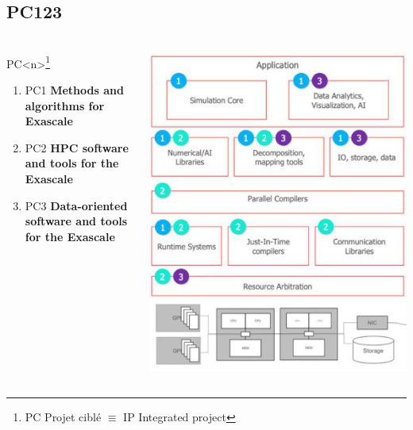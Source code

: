 \subsection{PC123}

\begin{frame}
  \frametitle{\insertsectionhead}
  \framesubtitle{\insertsubsectionhead}
  \begin{columns}
    \begin{column}{0.5\textwidth}
      \begin{alertblock}{PC<n>\footnote{PC Projet ciblé $\equiv$ IP Integrated project}}

      \begin{enumerate}
        \item \alert{PC1} \textbf{Methods and algorithms for
        Exascale}
        \item \alert{PC2} \textbf{HPC software and tools for the
        Exascale}
        \item \alert{PC3} \textbf{Data-oriented software and tools
        for the Exascale}
      \end{enumerate}
              
    \end{alertblock}
    \end{column}
    \begin{column}{.5\textwidth}
      \includegraphics[height=.76\paperheight]{../figures/numpex-ip123.png}
    \end{column}
  \end{columns}
  
\end{frame}
